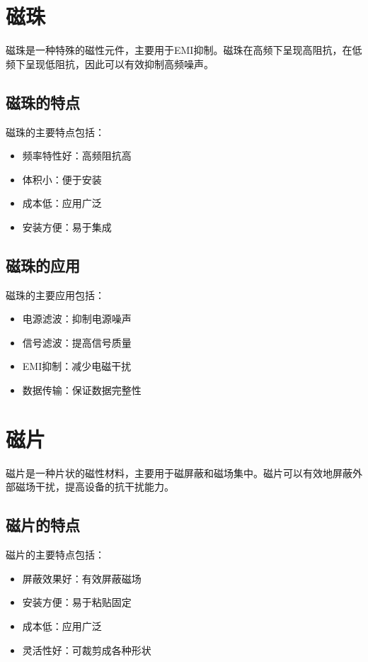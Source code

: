 \documentclass[12pt,UTF8]{ctexbook}
\begin{document}
\section{磁珠}

磁珠是一种特殊的磁性元件，主要用于EMI抑制。磁珠在高频下呈现高阻抗，在低频下呈现低阻抗，因此可以有效抑制高频噪声。

\subsection{磁珠的特点}

磁珠的主要特点包括：

\begin{itemize}[leftmargin=2cm]
    \item 频率特性好：高频阻抗高
    \item 体积小：便于安装
    \item 成本低：应用广泛
    \item 安装方便：易于集成
\end{itemize}

\subsection{磁珠的应用}

磁珠的主要应用包括：

\begin{itemize}[leftmargin=2cm]
    \item 电源滤波：抑制电源噪声
    \item 信号滤波：提高信号质量
    \item EMI抑制：减少电磁干扰
    \item 数据传输：保证数据完整性
\end{itemize}

\section{磁片}

磁片是一种片状的磁性材料，主要用于磁屏蔽和磁场集中。磁片可以有效地屏蔽外部磁场干扰，提高设备的抗干扰能力。

\subsection{磁片的特点}

磁片的主要特点包括：

\begin{itemize}[leftmargin=2cm]
    \item 屏蔽效果好：有效屏蔽磁场
    \item 安装方便：易于粘贴固定
    \item 成本低：应用广泛
    \item 灵活性好：可裁剪成各种形状
\end{itemize}
\end{document}
